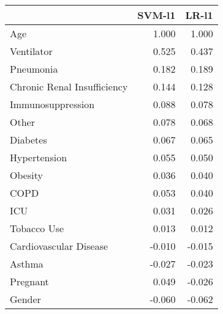 \begin{tabular}{lrr}
\toprule
{} &  SVM-l1 &  LR-l1 \\
\midrule
Age                         &   1.000 &  1.000 \\
Ventilator                  &   0.525 &  0.437 \\
Pneumonia                   &   0.182 &  0.189 \\
Chronic Renal Insufficiency &   0.144 &  0.128 \\
Immunosuppression           &   0.088 &  0.078 \\
Other                       &   0.078 &  0.068 \\
Diabetes                    &   0.067 &  0.065 \\
Hypertension                &   0.055 &  0.050 \\
Obesity                     &   0.036 &  0.040 \\
COPD                        &   0.053 &  0.040 \\
ICU                         &   0.031 &  0.026 \\
Tobacco Use                 &   0.013 &  0.012 \\
Cardiovascular Disease      &  -0.010 & -0.015 \\
Asthma                      &  -0.027 & -0.023 \\
Pregnant                    &   0.049 & -0.026 \\
Gender                      &  -0.060 & -0.062 \\
\bottomrule
\end{tabular}
